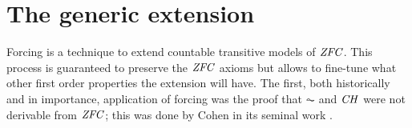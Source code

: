 \section{The generic extension}
Forcing is a technique to extend countable transitive models of
$\mathit{ZFC}$. This process is guaranteed to preserve the $\mathit{ZFC}$
axioms but allows to fine-tune what other first order properties the
extension will have. The first, both historically and in importance,
application of forcing was the proof that $\AC$ and $\mathit{CH}$ were not
derivable from $\mathit{ZFC}$; this was done by Cohen in its seminal work
\cite{Cohen-CH-PNAS}.


